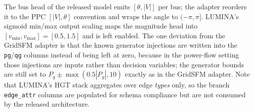 \documentclass[10pt]{article}
\begin{document}
\begin{table}[h!]
\centering
\caption{PPC branch-row parquet fields mapped onto the LUMINA-2M input schema.}
\label{tab:lumina-schema}
\small
{}
\end{table}

The bus head of the released model emits $[\theta, |V|]$ per bus; the adapter reorders it to the PPC $[|V|, \theta]$ convention and wraps the angle to $(-\pi, \pi]$. LUMINA's sigmoid min/max output scaling maps the magnitude head into $[v_{\min}, v_{\max}] = [0.5, 1.5]$ and is left enabled. The one deviation from the GridSFM adapter is that the known generator injections are written into the \texttt{pg}/\texttt{qg} columns instead of being left at zero, because in the power-flow setting those injections are inputs rather than decision variables; the generator bounds are still set to $P_g \pm \max(0.5|P_g|, 10)$ exactly as in the GridSFM adapter. Note that LUMINA's HGT stack aggregates over edge \emph{types} only, so the branch \texttt{edge\_attr} columns are populated for schema compliance but are not consumed by the released architecture.
\end{document}
